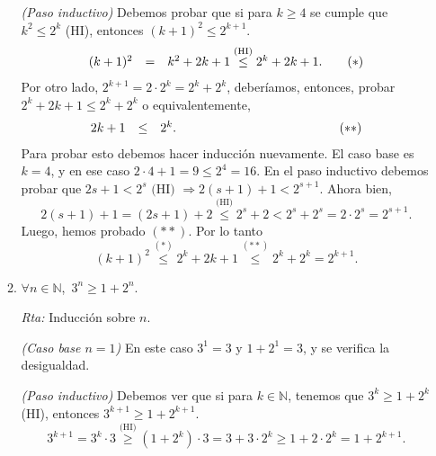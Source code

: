 \documentclass[12pt,spanish,makeidx]{amsbook}
\newcommand{\rta}{\noindent\textit{Rta: }}
\begin{document}
\begin{enumerate}
\begin{enumerate}
			\textit{(Paso inductivo)} Debemos probar que si para $k \ge 4$ se cumple  que  $k^2\leq 2^k$ (HI),  entonces $(k+1)^2\leq 2^{k+1}$. 
			\begin{equation*}
			\begin{array}{rclr}
			(k+1)^2 &=& k^2 + 2k +1 \overset{\text{(HI)}}{\le} 2^k +2k +1. \hfill &\quad \hfill(*)
			\end{array}
			\end{equation*}
			Por otro lado, $2^{k+1} = 2 \cdot 2^k = 2^k + 2^k$, deberíamos,  entonces,  probar $2^k +2k +1 \le 2^k +2^k$ o equivalentemente, 
			\begin{equation*}
			\begin{array}{rclr}
			2k +1   &\le&2^k. \hfill &\qquad\qquad\qquad\qquad\qquad\qquad \hfill\hfill(**)
			\end{array}
			\end{equation*}
			Para probar esto debemos hacer inducción nuevamente. El caso base es $k=4$, y en ese caso $2\cdot 4+ 1 = 9 \le 2^4 = 16$. En  el paso inductivo debemos probar que $2s+ 1 < 2^s \text{ (HI) } \Rightarrow 2(s+1)+ 1 < 2^{s+1}$. Ahora bien, 
			\begin{equation*}
			2(s+1)+ 1  = (2s + 1) +2 \overset{\text{(HI)}}{\le} 2^s + 2 < 2^s + 2^s = 2\cdot 2^s = 2^{s+1}. 
			\end{equation*}    
			Luego,  hemos probado $(**)$. Por lo tanto
			\begin{equation*}
			(k+1)^2 \overset{(*)}{\le}  2^k +2k +1 \overset{(**)}{\le} 2^k + 2^k = 2^{k+1}.
			\end{equation*}
			
			
			\item $\forall n \in {\mathbb N}$,\ $3^n \ge 1 + 2^n$.
			
			\rta Inducción sobre $n$.
			
			\textit{(Caso base $n=1$) } En este caso $3^1 = 3$ y $1+2^1 = 3$, y se verifica la desigualdad.
			
			\textit{(Paso inductivo) } Debemos ver que si para $k \in \mathbb N$, tenemos que   $3^{k} \ge 1 + 2^k$ (HI),  entonces $3^{k+1} \ge 1 + 2^{k+1}$. 
			\begin{equation*}
			3^{k+1} = 3^k\cdot 3 \overset{\text{(HI)}}{\ge} (1 + 2^k) \cdot 3 = 3 + 3 \cdot 2^k \ge 1 + 2\cdot 2^k = 1 + 2^{k+1}.
			\end{equation*}
			

\end{enumerate}
\end{enumerate}
\end{document}
